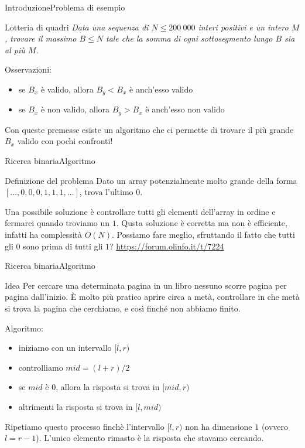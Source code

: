 \documentclass{beamer}
\begin{document}
\begin{frame}[t]{Introduzione}{Problema di esempio}
    \begin{exampleblock}{Lotteria di quadri}
    \textit{Data una sequenza di $N \leq 200 \ 000$ interi positivi e un intero $M$, trovare il massimo $B \leq N$ tale che la somma di ogni sottosegmento lungo $B$ sia al pi\`u $M$.}
    \end{exampleblock}
    Osservazioni:
    \begin{itemize}
        \item se $B_x$ \`e valido, allora $B_y < B_x$ \`e anch'esso valido
        \item se $B_x$ \`e non valido, allora $B_y > B_x$ \`e anch'esso non valido
    \end{itemize}
    \pause
    Con queste premesse esiste un algoritmo che ci permette di trovare il pi\`u grande $B_x$ valido con pochi confronti!
\end{frame}

\begin{frame}{Ricerca binaria}{Algoritmo}
    \begin{exampleblock}{Definizione del problema}
        Dato un array potenzialmente molto grande della forma $[\dots, 0, 0, 0, 1, 1, 1, \dots]$, trova l'ultimo $0$.
    \end{exampleblock}
    \pause
    Una possibile soluzione \`e controllare tutti gli elementi dell'array in ordine e fermarci 
    quando troviamo un $1$. Qusta soluzione è corretta ma non è efficiente, infatti ha complessità $O(N)$.
    Possiamo fare meglio, sfruttando il fatto che tutti gli $0$ sono prima di tutti gli $1$?
    \vfill
    \small{\underline{\url{https://forum.olinfo.it/t/7224}}}
\end{frame}

\begin{frame}{Ricerca binaria}{Algoritmo}
    \begin{block}{Idea}
        Per cercare una determinata pagina in un libro nessuno scorre pagina per pagina dall'inizio.
        \`E molto pi\`u pratico aprire circa a met\`a, controllare in che met\`a si trova la pagina che cerchiamo, e cos\`i finch\'e non abbiamo finito.
    \end{block}
    \pause
    Algoritmo:
    \begin{itemize}
        \item iniziamo con un intervallo $[l, r)$
        \pause
        \item controlliamo $mid = (l + r) / 2$
        \item se $mid$ è $0$, allora la risposta si trova in $[mid, r)$
        \item altrimenti la risposta si trova in $[l, mid)$
    \end{itemize}
    \pause
    Ripetiamo questo processo finchè l'intervallo $[l, r)$ non ha dimensione $1$
    (ovvero $l = r - 1$). L'unico elemento rimasto è la risposta che stavamo cercando.
\end{frame}
\end{document}
